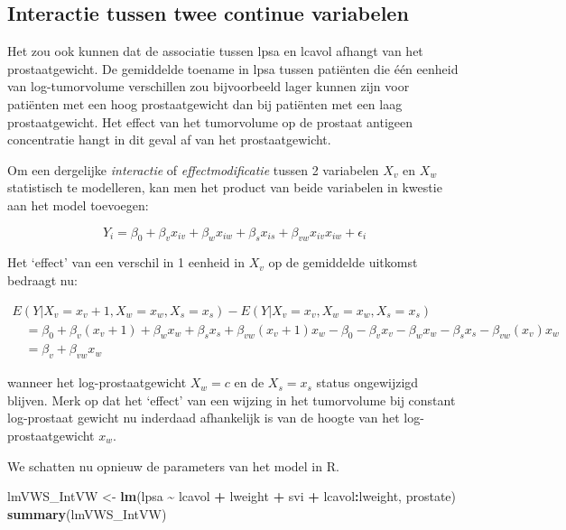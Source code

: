 \documentclass[
  12pt,dutch]{book}
\newenvironment{Shaded}{\begin{snugshade}}{\end{snugshade}}
\newcommand{\FunctionTok}[1]{\textcolor[rgb]{0.13,0.29,0.53}{\textbf{#1}}}
\newcommand{\NormalTok}[1]{#1}
\newcommand{\OtherTok}[1]{\textcolor[rgb]{0.56,0.35,0.01}{#1}}
\newcommand{\SpecialCharTok}[1]{\textcolor[rgb]{0.81,0.36,0.00}{\textbf{#1}}}
\theoremstyle{definition}
\theoremstyle{definition}
\theoremstyle{definition}
\theoremstyle{definition}
\theoremstyle{remark}
\begin{document}
\subsection{Interactie tussen twee continue variabelen}\label{sec:intCont}

Het zou ook kunnen dat de associatie tussen lpsa en lcavol afhangt van het prostaatgewicht. De gemiddelde toename in lpsa tussen patiënten die één eenheid van log-tumorvolume verschillen zou bijvoorbeeld lager kunnen zijn voor patiënten met een hoog prostaatgewicht dan bij patiënten met een laag prostaatgewicht. Het effect van het tumorvolume op de prostaat antigeen concentratie hangt in dit geval af van het prostaatgewicht.

Om een dergelijke \textit{interactie} of \textit{effectmodificatie} tussen 2 variabelen \(X_v\) en \(X_w\) statistisch te modelleren, kan men het product van beide variabelen in kwestie aan het model toevoegen:

\[
Y_i = \beta_0 + \beta_v x_{iv} + \beta_w x_{iw} +\beta_s x_{is} + \beta_{vw} x_{iv}x_{iw} +\epsilon_i
\]

Het `effect' van een verschil in 1 eenheid in \(X_v\) op de gemiddelde uitkomst bedraagt nu:

\[
\begin{array}{l}
E(Y|X_v=x_v+1,X_w=x_w,X_s=x_s) − E(Y|X_v=x_v,X_w=x_w,X_s=x_s) \\
\quad = \beta_0 + \beta_v (x_{v}+1) + \beta_w x_w +\beta_s x_{s} + \beta_{vw} (x_{v}+1) x_w - \beta_0 - \beta_v x_{v} - \beta_w x_w -\beta_s x_{s} - \beta_{vw} (x_{v}) x_w \\
\quad = \beta_v +  \beta_{vw} x_w
 \end{array}
\]

wanneer het log-prostaatgewicht \(X_w=c\) en de \(X_s=x_s\) status ongewijzigd blijven. Merk op dat het `effect' van een wijzing in het tumorvolume bij
constant log-prostaat gewicht nu inderdaad afhankelijk is van de hoogte van het log-prostaatgewicht \(x_w\).

We schatten nu opnieuw de parameters van het model in R.

\begin{Shaded}
\begin{Highlighting}[]
\NormalTok{lmVWS\_IntVW }\OtherTok{\textless{}{-}} \FunctionTok{lm}\NormalTok{(lpsa }\SpecialCharTok{\textasciitilde{}}\NormalTok{ lcavol }\SpecialCharTok{+}\NormalTok{ lweight }\SpecialCharTok{+}\NormalTok{ svi }\SpecialCharTok{+}\NormalTok{ lcavol}\SpecialCharTok{:}\NormalTok{lweight,}
\NormalTok{    prostate)}
\FunctionTok{summary}\NormalTok{(lmVWS\_IntVW)}
\end{Highlighting}
\end{Shaded}
\end{document}
